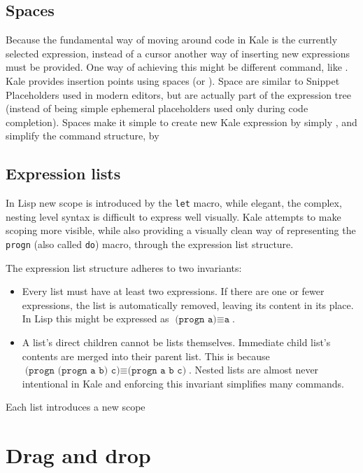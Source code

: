 \subsection{Spaces}
\label{expr:blank}
Because the fundamental way of moving around code in Kale is the currently
selected expression, instead of a cursor another way of inserting new
expressions must be provided. One way of achieving this might be different
 command, like . Kale
provides insertion points using spaces (or ).
Space are similar to Snippet Placeholders used in modern editors,
but are actually part of the expression tree (instead of being simple ephemeral
placeholders used only during code completion). Spaces make it simple to create
new Kale expression by simply , and simplify the
command structure, by 

\subsection{Expression lists}
\label{expr:list}
In Lisp new scope is introduced by the \texttt{let} macro, while elegant, the
complex, nesting level syntax is difficult to express well visually. Kale
attempts to make scoping more visible, while also providing a visually clean
way of representing the \texttt{progn} (also called \texttt{do}) macro,
through the expression list structure.

The expression list structure adheres to two invariants:
\begin{itemize}[noitemsep]
	\item Every list must have at least two expressions. If there are one or
	fewer expressions, the list is automatically removed, leaving its content
	in its place. In Lisp this might be expressed as
	$\texttt{(progn a)} \equiv \texttt{a}$.
	\item A list's direct children cannot be lists themselves. Immediate child
	list's contents are merged into their parent list. This is because
	$\texttt{(progn (progn a b) c)} \equiv \texttt{(progn a b c)}$.
	Nested lists are almost never intentional in Kale and enforcing this
	invariant simplifies many commands.
\end{itemize}

Each list introduces a new scope 

\section{Drag and drop}

